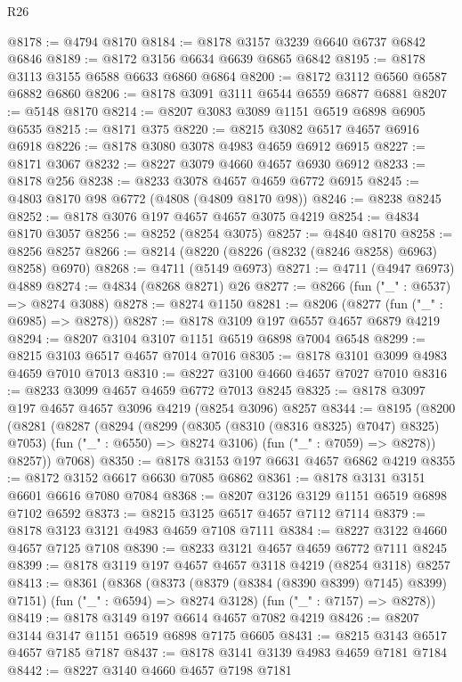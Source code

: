 \begin{lexlean}{R26}
\begin{coremodule}
@8178 := @4794 @8170
@8184 := @8178 @3157 @3239 @6640 @6737 @6842 @6846
@8189 := @8172 @3156 @6634 @6639 @6865 @6842
@8195 := @8178 @3113 @3155 @6588 @6633 @6860 @6864
@8200 := @8172 @3112 @6560 @6587 @6882 @6860
@8206 := @8178 @3091 @3111 @6544 @6559 @6877 @6881
@8207 := @5148 @8170
@8214 := @8207 @3083 @3089 @1151 @6519 @6898 @6905 @6535
@8215 := @8171 @375
@8220 := @8215 @3082 @6517 @4657 @6916 @6918
@8226 := @8178 @3080 @3078 @4983 @4659 @6912 @6915
@8227 := @8171 @3067
@8232 := @8227 @3079 @4660 @4657 @6930 @6912
@8233 := @8178 @256
@8238 := @8233 @3078 @4657 @4659 @6772 @6915
@8245 := @4803 @8170 @98 @6772 (@4808 (@4809 @8170 @98))
@8246 := @8238 @8245
@8252 := @8178 @3076 @197 @4657 @4657 @3075 @4219
@8254 := @4834 @8170 @3057
@8256 := @8252 (@8254 @3075)
@8257 := @4840 @8170
@8258 := @8256 @8257
@8266 := @8214 (@8220 (@8226 (@8232 (@8246 @8258) @6963) @8258) @6970)
@8268 := @4711 (@5149 @6973)
@8271 := @4711 (@4947 @6973) @4889
@8274 := @4834 (@8268 @8271) @26
@8277 := @8266 (fun ("_" : @6537) => @8274 @3088)
@8278 := @8274 @1150
@8281 := @8206 (@8277 (fun ("_" : @6985) => @8278))
@8287 := @8178 @3109 @197 @6557 @4657 @6879 @4219
@8294 := @8207 @3104 @3107 @1151 @6519 @6898 @7004 @6548
@8299 := @8215 @3103 @6517 @4657 @7014 @7016
@8305 := @8178 @3101 @3099 @4983 @4659 @7010 @7013
@8310 := @8227 @3100 @4660 @4657 @7027 @7010
@8316 := @8233 @3099 @4657 @4659 @6772 @7013 @8245
@8325 := @8178 @3097 @197 @4657 @4657 @3096 @4219 (@8254 @3096) @8257
@8344 := @8195
    (@8200
      (@8281
        (@8287
          (@8294
            (@8299 (@8305 (@8310 (@8316 @8325) @7047) @8325) @7053)
            (fun ("_" : @6550) => @8274 @3106)
            (fun ("_" : @7059) => @8278))
          @8257))
      @7068)
@8350 := @8178 @3153 @197 @6631 @4657 @6862 @4219
@8355 := @8172 @3152 @6617 @6630 @7085 @6862
@8361 := @8178 @3131 @3151 @6601 @6616 @7080 @7084
@8368 := @8207 @3126 @3129 @1151 @6519 @6898 @7102 @6592
@8373 := @8215 @3125 @6517 @4657 @7112 @7114
@8379 := @8178 @3123 @3121 @4983 @4659 @7108 @7111
@8384 := @8227 @3122 @4660 @4657 @7125 @7108
@8390 := @8233 @3121 @4657 @4659 @6772 @7111 @8245
@8399 := @8178 @3119 @197 @4657 @4657 @3118 @4219 (@8254 @3118) @8257
@8413 := @8361
    (@8368
      (@8373 (@8379 (@8384 (@8390 @8399) @7145) @8399) @7151)
      (fun ("_" : @6594) => @8274 @3128)
      (fun ("_" : @7157) => @8278))
@8419 := @8178 @3149 @197 @6614 @4657 @7082 @4219
@8426 := @8207 @3144 @3147 @1151 @6519 @6898 @7175 @6605
@8431 := @8215 @3143 @6517 @4657 @7185 @7187
@8437 := @8178 @3141 @3139 @4983 @4659 @7181 @7184
@8442 := @8227 @3140 @4660 @4657 @7198 @7181

\end{coremodule}
\end{lexlean}
